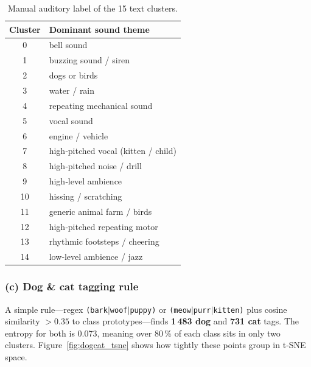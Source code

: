 \documentclass[runningheads]{llncs}
\begin{document}
\begin{table}[h]
  \caption{Manual auditory label of the 15 text clusters.}
  \label{tab:text_themes}
  \centering
  \small
  \begin{tabular}{cl}
    \toprule
    Cluster & Dominant sound theme \\ \midrule
    0 & bell sound \\
    1 & buzzing sound / siren \\
    2 & dogs or birds \\
    3 & water / rain \\
    4 & repeating mechanical sound \\
    5 & vocal sound \\
    6 & engine / vehicle \\
    7 & high‑pitched vocal (kitten / child) \\
    8 & high‑pitched noise / drill \\
    9 & high‑level ambience \\
    10 & hissing / scratching \\
    11 & generic animal farm / birds \\
    12 & high‑pitched repeating motor \\
    13 & rhythmic footsteps / cheering \\
    14 & low‑level ambience / jazz \\
    \bottomrule
  \end{tabular}
\end{table}

\subsubsection{(c) Dog \& cat tagging rule}
A simple rule—regex \texttt{(bark$|$woof$|$puppy)} or \texttt{(meow$|$purr$|$kitten)} plus cosine similarity $>0.35$ to class prototypes—finds \textbf{1\,483 dog} and \textbf{731 cat} tags. The entropy for both is 0.073, meaning over 80\,\% of each class sits in only two clusters. Figure~\ref{fig:dogcat_tsne} shows how tightly these points group in t‑SNE space.
\end{document}
